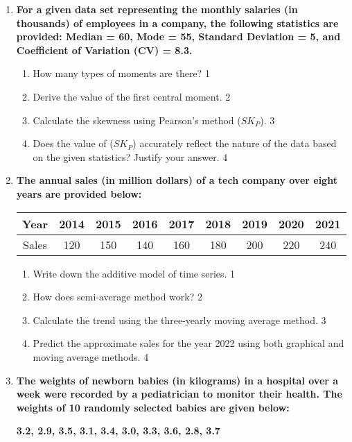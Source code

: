 \documentclass{article}
\begin{document}
\begin{enumerate}
\item
\textbf{For a given data set representing the monthly salaries (in thousands) of employees in a company, the following statistics are provided: Median = 60, Mode = 55, Standard Deviation = 5, and Coefficient of Variation (CV) = 8.3.}

\begin{enumerate}
    \item How many types of moments are there?  \hfill 1
    \item Derive the value of the first central moment. \hfill 2
    \item  
    Calculate the skewness using Pearson's method ($SK_P$). \hfill 3
    \item
    Does the value of ($SK_P$) accurately reflect the nature of the data based on the given statistics? Justify your answer. \hfill 4
\end{enumerate}

\item
\textbf{The annual sales (in million dollars) of a tech company over eight years are provided below:}

\begin{table}[H]
\centering
\begin{tabular}{ccccccccc}
Year     & 2014 & 2015 & 2016 & 2017 & 2018 & 2019 & 2020 & 2021 \\ \hline
Sales    & 120  & 150  & 140  & 160  & 180  & 200  & 220  & 240   
\end{tabular}
\end{table}

\begin{enumerate}
 \item Write down the additive model of time series. \hfill 1
 \item How does semi-average method work? \hfill 2
    \item  
    Calculate the trend using the three-yearly moving average method. \hfill 3
    \item
    Predict the approximate sales for the year 2022 using both graphical and moving average methods. \hfill 4
\end{enumerate}

\item
\textbf{The weights of newborn babies (in kilograms) in a hospital over a week were recorded by a pediatrician to monitor their health. The weights of 10 randomly selected babies are given below:}

\begin{center}
\textbf{3.2, 2.9, 3.5, 3.1, 3.4, 3.0, 3.3, 3.6, 2.8, 3.7}
\end{center}


\end{enumerate}
\end{document}
